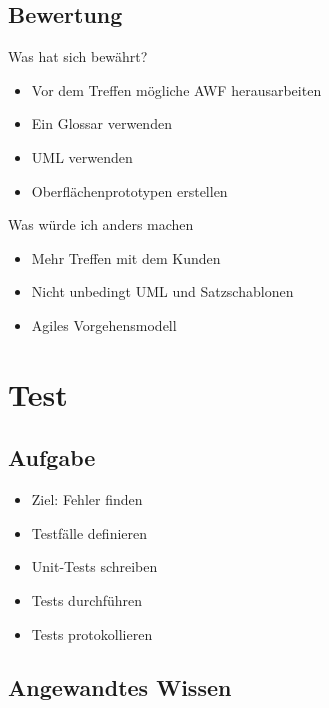 \documentclass{beamer}
\begin{document}
  \subsection{Bewertung}
  \begin{frame}{\subsecname}
    \begin{block}{Was hat sich bewährt?}
      \begin{itemize}
        \item Vor dem Treffen mögliche AWF herausarbeiten
        \item Ein Glossar verwenden
        \item UML verwenden
        \item Oberflächenprototypen erstellen
      \end{itemize}
    \end{block}

    \begin{block}{Was würde ich anders machen}
      \begin{itemize}
        \item Mehr Treffen mit dem Kunden
        \item Nicht unbedingt UML und Satzschablonen
        \item Agiles Vorgehensmodell
      \end{itemize}
    \end{block}
  \end{frame}


  \section{Test}
  \subsection{Aufgabe}
  \begin{frame}{\subsecname}
    \begin{itemize}
      \item Ziel: Fehler finden
      \item Testfälle definieren
      \item Unit-Tests schreiben
      \item Tests durchführen
      \item Tests protokollieren
    \end{itemize}
  \end{frame}

  \subsection{Angewandtes Wissen}
  \begin{frame}{\subsecname}
  \end{frame}
\end{document}
